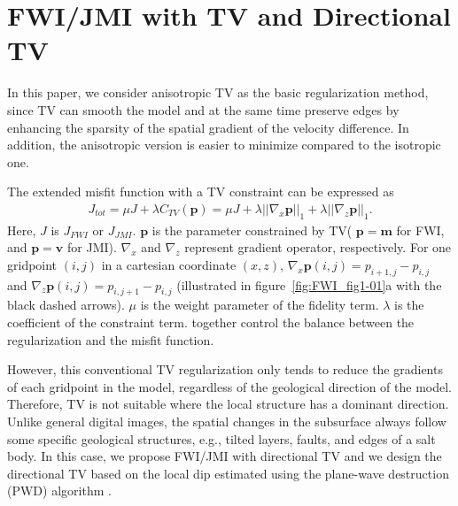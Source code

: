 \section{FWI/JMI with TV and Directional TV}
In this paper, we consider anisotropic TV as the basic regularization method, since TV can smooth the model and at the same time preserve edges by enhancing the sparsity of the spatial gradient of the velocity difference. In addition, the anisotropic version is easier to minimize compared to the isotropic one. 

The extended misfit function with a TV constraint can be expressed as
\begin{equation}
\begin{split}
      J_{tot} = \mu J + \lambda C_{TV} \left(\mathbf{p} \right) = \mu J + \lambda ||\nabla_x \mathbf{p}||_1 + \lambda ||\nabla_z \mathbf{p}||_1.
\label{eq2:J with TV}
\end{split}
\end{equation}
Here, $J$ is $J_{FWI}$ or $J_{JMI}$. $\mathbf{p}$ is the parameter constrained by TV( $\mathbf{p}=\mathbf{m}$ for FWI, and $\mathbf{p} = \mathbf{v}$ for JMI). $\nabla_x$ and $\nabla_z$ represent gradient operator, respectively. For one gridpoint $\left(i,j\right)$ in a cartesian coordinate $\left(x,z\right)$, $\nabla_x \mathbf{p}\left(i,j\right) = p_{i+1,j} - p_{i,j}$ and $\nabla_z \mathbf{p}\left(i,j\right) = p_{i,j+1} - p_{i,j}$ (illustrated in figure~\ref{fig:FWI_fig1-01}a with the black dashed arrows). $\mu$ is the weight parameter of the fidelity term. $\lambda$ is the coefficient of the constraint term.  together control the balance between the regularization and the misfit function.

However, this conventional TV regularization only tends to reduce the gradients of each gridpoint in the model, regardless of the geological direction of the model. Therefore, TV is not suitable where the local structure has a dominant direction. Unlike general digital images, the spatial changes in the subsurface always follow some specific geological structures, e.g., tilted layers, faults, and edges of a salt body. In this case, we propose FWI/JMI with directional TV and we design the directional TV based on the local dip estimated using the plane-wave destruction (PWD) algorithm \citep{fomel2002applications}. 

